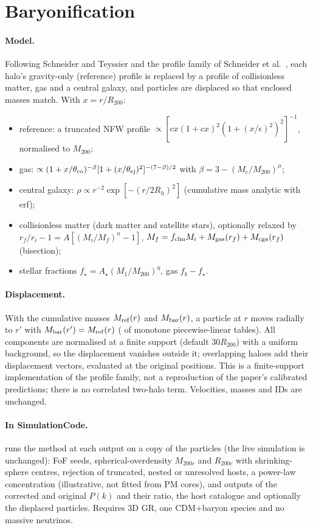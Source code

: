 \section{Baryonification}\label{sec:baryonification}

\paragraph*{Model.} Following Schneider and Teyssier \cite{SchneiderTeyssier2015} and the profile family of
Schneider et al.\ \cite{Schneider2019}, each halo's gravity-only (reference) profile is replaced by a profile of
collisionless matter, gas and a central galaxy, and particles are displaced so that enclosed masses match. With
$x=r/R_{200}$:
\begin{itemize}
\item reference: a truncated NFW profile $\propto[cx(1+cx)^2(1+(x/\epsilon)^2)^2]^{-1}$, normalised to $M_{200}$;
\item gas: $\propto(1+x/\theta_{\rm co})^{-\beta}[1+(x/\theta_{\rm ej})^2]^{-(7-\beta)/2}$ with $\beta=3-(M_c/M_{200})^\mu$;
\item central galaxy: $\rho\propto r^{-2}\exp[-(r/2R_h)^2]$ (cumulative mass analytic with erf);
\item collisionless matter (dark matter and satellite stars), optionally relaxed by
      $r_f/r_i-1=A[(M_i/M_f)^n-1]$, $M_f=f_{\rm clm}M_i+M_{\rm gas}(r_f)+M_{\rm cga}(r_f)$ (bisection);
\item stellar fractions $f_\star=A_\star(M_1/M_{200})^{\eta}$, gas $f_b-f_\star$.
\end{itemize}
\paragraph*{Displacement.} With the cumulative masses $M_{\rm ref}(r)$ and $M_{\rm bar}(r)$, a particle at $r$ moves
radially to $r'$ with $M_{\rm bar}(r')=M_{\rm ref}(r)$ ( of monotone piecewise-linear tables). All
components are normalised at a finite support (default $30R_{200}$) with a uniform background, so the displacement
vanishes outside it; overlapping haloes add their displacement vectors, evaluated at the original positions. This is a
finite-support implementation of the profile family, not a reproduction of the paper's calibrated predictions; there is
no correlated two-halo term. Velocities, masses and IDs are unchanged.

\paragraph*{In SimulationCode.}  runs the method at each output on a copy of the particles
(the live simulation is unchanged): FoF seeds, spherical-overdensity $M_{200c}$ and $R_{200c}$ with shrinking-sphere
centres, rejection of truncated, nested or unresolved hosts, a power-law concentration (illustrative, not fitted from PM
cores), and outputs of the corrected and original $P(k)$ and their ratio, the host catalogue and optionally the
displaced particles. Requires 3D GR, one CDM+baryon species and no massive neutrinos.

